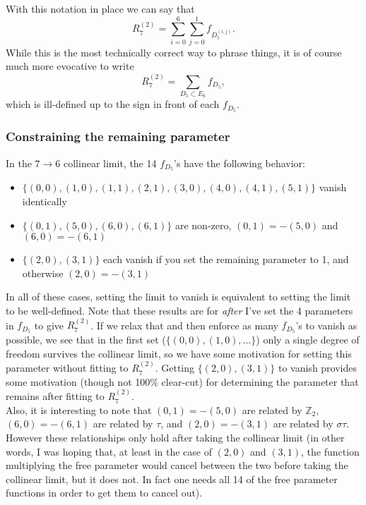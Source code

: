 \documentclass[12pt]{article}
\def\fd5{f_{D_5}}
\def\d5{D_5}
\def\e6{E_6}
\def\r27{R^{(2)}_7}
\begin{document}
With this notation in place we can say that 
\begin{equation}
	\r27 = \sum_{i=0}^{6}\sum_{j=0}^{1} f_{D_5^{(i,j)}}.
\end{equation}
While this is the most technically correct way to phrase things, it is of course much more evocative to write
\begin{equation}
	\r27 = \sum_{\d5\subset\e6} f_{D_5},
\end{equation}
which is ill-defined up to the sign in front of each $\fd5$. 


\subsubsection*{Constraining the remaining parameter}

In the $7\to6$ collinear limit, the 14 $\fd5$'s have the following behavior:

\begin{itemize}
	\item $\{(0, 0), (1, 0), (1, 1), (2, 1), (3, 0), (4, 0), (4, 1), (5, 1)\}$ vanish identically
	\item $\{(0, 1), (5, 0), (6, 0), (6, 1)\}$ are non-zero, $(0, 1)=-(5, 0)$ and $(6, 0)=-(6, 1)$
	\item $\{(2, 0), (3, 1)\}$ each vanish if you set the remaining parameter to 1, and otherwise $(2, 0)=-(3, 1)$
\end{itemize}
In all of these cases, setting the limit to vanish is equivalent to setting the limit to be well-defined. Note that these results are for \emph{after} I've set the 4 parameters in $\fd5$ to give $\r27$. If we relax that and then enforce as many $\fd5$'s to vanish as possible, we see that in the first set ($\{(0, 0), (1, 0), \ldots\}$) only a single degree of freedom survives the collinear limit, so we have some motivation for setting this parameter without fitting to $\r27$. Getting $\{(2, 0), (3, 1)\}$ to vanish provides some motivation (though not 100\% clear-cut) for determining the parameter that remains after fitting to $\r27$. \\

Also, it is interesting to note that $(0, 1)=-(5, 0)$ are related by $\mathbb{Z}_2$, $(6, 0)=-(6, 1)$ are related by $\tau$, and $(2, 0)=-(3, 1)$ are related by $\sigma\tau$. However these relationships only hold after taking the collinear limit (in other words, I was hoping that, at least in the case of $(2, 0)$ and $(3, 1)$, the function multiplying the free parameter would cancel between the two before taking the collinear limit, but it does not. In fact one needs all 14 of the free parameter functions in order to get them to cancel out).\\
\end{document}
